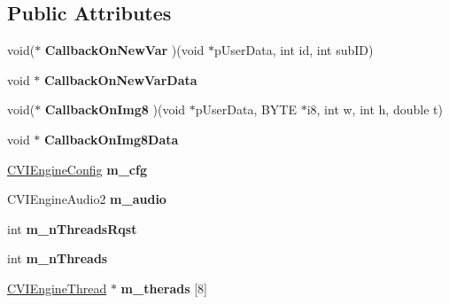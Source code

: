 \subsection*{Public Attributes}
\begin{DoxyCompactItemize}
\item 
\hypertarget{class_c_v_i_engine_base_ab3883b66e78478803c693b4ad2f5b0e7}{void($\ast$ {\bfseries Callback\+On\+New\+Var} )(void $\ast$p\+User\+Data, int id, int sub\+I\+D)}\label{class_c_v_i_engine_base_ab3883b66e78478803c693b4ad2f5b0e7}

\item 
\hypertarget{class_c_v_i_engine_base_aa0d4e70811444be165a4b9c2a4aa7aae}{void $\ast$ {\bfseries Callback\+On\+New\+Var\+Data}}\label{class_c_v_i_engine_base_aa0d4e70811444be165a4b9c2a4aa7aae}

\item 
\hypertarget{class_c_v_i_engine_base_a4f0ddf3af6a98c243d97cbcc9be38e18}{void($\ast$ {\bfseries Callback\+On\+Img8} )(void $\ast$p\+User\+Data, B\+Y\+T\+E $\ast$i8, int w, int h, double t)}\label{class_c_v_i_engine_base_a4f0ddf3af6a98c243d97cbcc9be38e18}

\item 
\hypertarget{class_c_v_i_engine_base_abfaf1ec8dec9a82c896a90c708dfd756}{void $\ast$ {\bfseries Callback\+On\+Img8\+Data}}\label{class_c_v_i_engine_base_abfaf1ec8dec9a82c896a90c708dfd756}

\item 
\hypertarget{class_c_v_i_engine_base_a867f7342010985b0b21beb4feaf354b8}{\hyperlink{class_c_v_i_engine_config}{C\+V\+I\+Engine\+Config} {\bfseries m\+\_\+cfg}}\label{class_c_v_i_engine_base_a867f7342010985b0b21beb4feaf354b8}

\item 
\hypertarget{class_c_v_i_engine_base_af996670eec8597e3529bfd0a2ec2585e}{C\+V\+I\+Engine\+Audio2 {\bfseries m\+\_\+audio}}\label{class_c_v_i_engine_base_af996670eec8597e3529bfd0a2ec2585e}

\item 
\hypertarget{class_c_v_i_engine_base_a36e1cc3cb814a08af53e9b4076b51dae}{int {\bfseries m\+\_\+n\+Threads\+Rqst}}\label{class_c_v_i_engine_base_a36e1cc3cb814a08af53e9b4076b51dae}

\item 
\hypertarget{class_c_v_i_engine_base_a0041ab05a40ba6a0bca65c78ea9d8189}{int {\bfseries m\+\_\+n\+Threads}}\label{class_c_v_i_engine_base_a0041ab05a40ba6a0bca65c78ea9d8189}

\item 
\hypertarget{class_c_v_i_engine_base_a4fdf197fd70d474cf4365abba485c461}{\hyperlink{class_c_v_i_engine_thread}{C\+V\+I\+Engine\+Thread} $\ast$ {\bfseries m\+\_\+therads} \mbox{[}8\mbox{]}}\label{class_c_v_i_engine_base_a4fdf197fd70d474cf4365abba485c461}


\end{DoxyCompactItemize}
